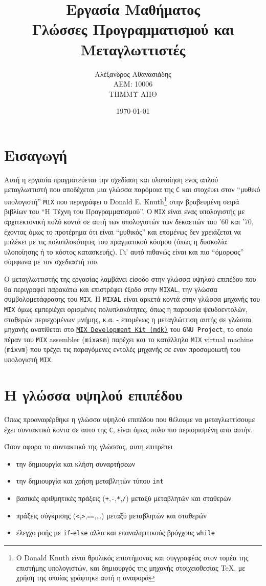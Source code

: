 \documentclass[a4paper,11pt]{article}
\title{Εργασία Μαθήματος \\ \textbf{Γλώσσες Προγραμματισμού και Μεταγλωττιστές}}
\author{Αλέξανδρος Αθανασιάδης \\ ΑΕΜ: 10006 \\ ΤΗΜΜΥ ΑΠΘ}
\date{\today}
\newcommand{\eng}[1]{\foreignlanguage{english}{#1}}
\newcommand{\tech}[1]{\foreignlanguage{english}{\texttt{#1}}}
\begin{document}
\maketitle

\section*{Εισαγωγή}
Αυτή η εργασία πραγματεύεται την σχεδίαση και υλοποίηση ενος απλού μεταγλωττιστή
που αποδέχεται μια γλώσσα παρόμοια της \tech{C} και στοχέυει στον 
\enquote{μυθικό υπολογιστή} \tech{MIX} που περιγράφει ο \eng{Donald E. Knuth}\footnote{
	Ο \eng{Donald Knuth} είναι θρυλικός επιστήμονας και συγγραφέας στον
	τομέα της επιστήμης υπολογιστών, και δημιουργός της μηχανής στοιχειοθεσίας
	\TeX, με χρήση της οποίας γράφτηκε αυτή η αναφορά
} στην βραβευμένη σειρά βιβλίων του \enquote{Η Τέχνη του Προγραμματισμού}. O \tech{MIX} 
είναι ενας υπολογιστής με αρχιτεκτονική πολύ κοντά σε αυτή των υπολογιστών των δεκαετιών του 
'60 και '70, έχοντας όμως το προτέρημα ότι είναι \enquote{μυθικός} και επομένως δεν χρειάζεται
να μπλέκει με τις πολυπλοκότητες του πραγματικού κόσμου (όπως η δυσκολία υλοποίησης
ή το κόστος κατασκευής). Γι' αυτό πιθανώς είναι και πιο \enquote{όμορφος} σύμφωνα με
τον σχεδιαστή του.

Ο μεταγλωττιστής της εργασίας λαμβάνει είσοδο στην γλώσσα υψηλού επιπέδου που
θα περιγραφεί παρακάτω και επιστρέφει έξοδο στην \tech{MIXAL}, την γλώσσα
συμβολομετάφρασης του \tech{MIX}. Η \tech{MIXAL} είναι αρκετά κοντά στην 
γλώσσα μηχανής του \tech{MIX} όμως εμπεριέχει ορισμένες πολυπλοκότητες, όπως
η παρουσία ψευδοεντολών, σταθερών περιεχομένων μνήμης, κ.α. - επομένως η 
μεταγλώττιση αυτής σε γλώσσα μηχανής ανατίθεται στο 
\href{https://www.gnu.org/software/mdk/}{\tech{MIX Development Kit (mdk)}} 
του \tech{GNU Project}, το οποίο πέραν του \tech{MIX} \eng{assembler} (\tech{mixasm}) 
παρέχει και το κατάλληλο \tech{MIX} \eng{virtual machine} (\tech{mixvm}) 
που τρέχει τις παραγόμενες εντολές μηχανής σε εναν προσομοιωτή του υπολογιστή \tech{MIX}.

\section{Η γλώσσα υψηλού επιπέδου}
Όπως προαναφέρθηκε η γλώσσα υψηλού επιπέδου που θέλουμε να μεταγλωττίσουμε έχει
συντακτικό κοντα σε αυτο της \tech{C}, είναι όμως πολυ πιο περιορισμένη απο αυτήν.

Όσον αφορα το συντακτικό της γλώσσας, αυτη επιτρέπει 
\begin{itemize}
\item την δημιουργία και κλήση συναρτήσεων
\item την δημιουργία και χρήση μεταβλητών τύπου \tech{int}
\item βασικές αριθμητικές πράξεις (\tech{+},\tech{-},\tech{*},\tech{/}) μεταξύ 
	μεταβλητών και σταθερών
\item πράξεις σύγκρισης (\tech{<},\tech{>},\tech{==},\dots) μεταξύ μεταβλητών και σταθερών
\item έλεγχο ροής με \tech{if}-\tech{else} αλλα και επαναληπτικούς βρόγχους \tech{while}
\end{itemize}
\end{document}
